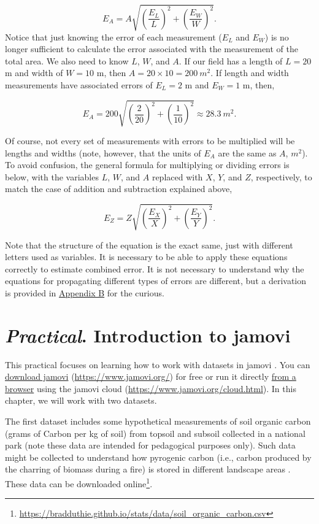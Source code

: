 \documentclass[
  openany]{scrbook}
\begin{document}
\[E_{A} = A \sqrt{\left(\frac{E_{L}}{L} \right)^{2} + \left(\frac{E_{W}}{W} \right)^{2}}.\]
Notice that just knowing the error of each measurement (\(E_{L}\) and \(E_{W}\)) is no longer sufficient to calculate the error associated with the measurement of the total area.
We also need to know \(L\), \(W\), and \(A\).
If our field has a length of \(L = 20\) m and width of \(W = 10\) m, then \(A = 20 \times 10 = 200\:m^{2}\).
If length and width measurements have associated errors of \(E_{L} = 2\) m and \(E_{W} = 1\) m, then,

\[E_{A} = 200 \sqrt{\left(\frac{2}{20} \right)^{2} + \left(\frac{1}{10} \right)^{2}} \approx 28.3\:m^{2}.\]

Of course, not every set of measurements with errors to be multiplied will be lengths and widths (note, however, that the units of \(E_{A}\) are the same as \(A\), \(m^{2}\)).
To avoid confusion, the general formula for multiplying or dividing errors is below, with the variables \(L\), \(W\), and \(A\) replaced with \(X\), \(Y\), and \(Z\), respectively, to match the case of addition and subtraction explained above,

\[E_{Z} = Z \sqrt{\left(\frac{E_{X}}{X} \right)^{2} + \left(\frac{E_{Y}}{Y} \right)^{2}}.\]

Note that the structure of the equation is the exact same, just with different letters used as variables.
It is necessary to be able to apply these equations correctly to estimate combined error.
It is not necessary to understand why the equations for propagating different types of errors are different, but a derivation is provided in \protect\hyperlink{uncertainty_derivation}{Appendix B} for the curious.

\hypertarget{Chapter_8}{%
\chapter{\texorpdfstring{\emph{Practical}. Introduction to jamovi}{Practical. Introduction to jamovi}}\label{Chapter_8}}

This practical focuses on learning how to work with datasets in jamovi \citep{Jamovi2022}.
You can \href{https://www.jamovi.org/download.html}{download jamovi} (\url{https://www.jamovi.org/}) for free or run it directly \href{https://www.jamovi.org/cloud.html}{from a browser} using the jamovi cloud (\url{https://www.jamovi.org/cloud.html}).
In this chapter, we will work with two datasets.

The first dataset includes some hypothetical measurements of soil organic carbon (grams of Carbon per kg of soil) from topsoil and subsoil collected in a national park (note these data are intended for pedagogical purposes only).
Such data might be collected to understand how pyrogenic carbon (i.e., carbon produced by the charring of biomass during a fire) is stored in different landscape areas \citep{Santin2016, Preston2006}.
These data can be downloaded online\footnote{\url{https://bradduthie.github.io/stats/data/soil_organic_carbon.csv}}.
\end{document}
